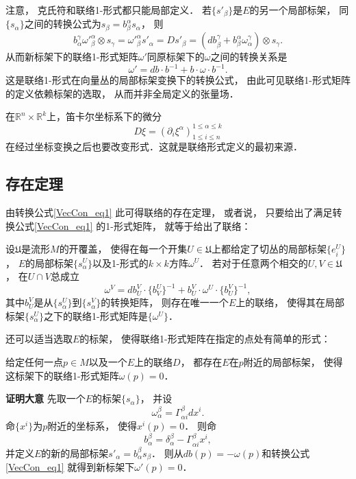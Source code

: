 注意， 克氏符和联络1-形式都只能局部定义． 若$\{s'_\beta\}$是$E$的另一个局部标架， 同$\{s_\alpha\}$之间的转换公式为$s_\beta=b_\beta^\alpha s_\alpha$， 则
$$
b_\alpha^\gamma{\omega'}_{\beta}^{\alpha}\otimes s_\gamma={\omega'}_{\beta}^{\alpha}s'_\alpha=Ds'_\beta=(db_\beta^\gamma+b_\beta^\alpha\omega_\alpha^\gamma)\otimes s_\gamma.
$$
从而新标架下的联络1-形式矩阵$\omega'$同原标架下的$\omega$之间的转换关系是
\begin{equation}\label{VecCon_eq1}
\omega'=db\cdot b^{-1}+b\cdot\omega\cdot b^{-1}.
\end{equation}
这是联络1-形式在向量丛的局部标架变换下的转换公式， 由此可见联络1-形式矩阵的定义依赖标架的选取， 从而并非全局定义的张量场．

在$\mathbb{R}^n\times\mathbb{R}^k$上，笛卡尔坐标系下的微分
$$
D\xi=(\partial_i\xi^\alpha)_{1\leq i\leq n}^{1\leq\alpha\leq k}
$$
在经过坐标变换之后也要改变形式．这就是联络形式定义的最初来源．

\subsection{存在定理}
由转换公式\autoref{VecCon_eq1} 此可得联络的存在定理， 或者说， 只要给出了满足转换公式\autoref{VecCon_eq1} 的1-形式矩阵， 就等于给出了联络：
\begin{theorem}{}
设$\mathfrak{U}$是流形$M$的开覆盖， 使得在每一个开集$U\in\mathfrak{U}$上都给定了切丛的局部标架$\{e^U_i\}$， $E$的局部标架$\{s^U_\alpha\}$以及1-形式的$k\times k$方阵$\omega^U$． 若对于任意两个相交的$U,V\in\mathfrak{U}$， 在$U\cap V$总成立
$$
\omega^V=db^V_U\cdot \{b_V^U\}^{-1}+b^V_U\cdot\omega^U\cdot \{b^V_U\}^{-1},
$$
其中$b^V_U$是从$\{s^U_\alpha\}$到$\{s^V_\alpha\}$的转换矩阵， 则存在唯一一个$E$上的联络， 使得其在局部标架$\{s^U_\alpha\}$之下的联络1-形式矩阵是$\{\omega^U\}$．
\end{theorem}

还可以适当选取$E$的标架， 使得联络1-形式矩阵在指定的点处有简单的形式：
\begin{theorem}{}
给定任何一点$p\in M$以及一个$E$上的联络$D$， 都存在$E$在$p$附近的局部标架， 使得这标架下的联络1-形式矩阵$\omega(p)=0$．
\end{theorem}
\textbf{证明大意} 先取一个$E$的标架$\{s_\alpha\}$， 并设
$$
\omega^\beta_\alpha=\Gamma_{\alpha i}^\beta dx^i.
$$
命$\{x^i\}$为$p$附近的坐标系， 使得$x^i(p)=0$． 则命
$$
b_\alpha^\beta=\delta_\alpha^\beta-\Gamma_{\alpha i}^\beta x^i,
$$
并定义$E$的新的局部标架$s'_\alpha=b_\alpha^\beta s_\beta$． 则从$db(p)=-\omega(p)$和转换公式\autoref{VecCon_eq1} 就得到新标架下$\omega'(p)=0$．

